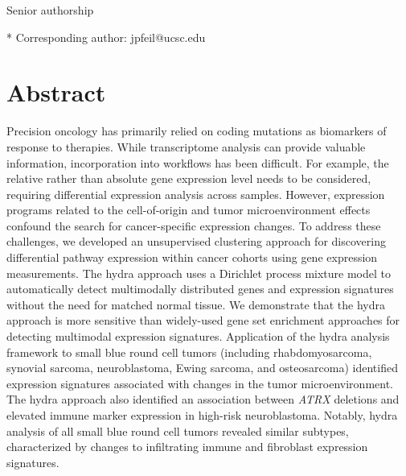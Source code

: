 \documentclass[10pt,letterpaper]{article}
\begin{document}
\begin{flushleft}
%
%

\ddag Senior authorship




* Corresponding author: jpfeil@ucsc.edu

\end{flushleft}
\section*{Abstract}
Precision oncology has primarily relied on coding mutations as biomarkers of response to therapies. While transcriptome analysis can provide valuable information, incorporation into workflows has been difficult. For example, the relative rather than absolute gene expression level needs to be considered, requiring differential expression analysis across samples. However, expression programs related to the cell-of-origin and tumor microenvironment effects confound the search for cancer-specific expression changes. To address these challenges, we developed an unsupervised clustering approach for discovering differential pathway expression within cancer cohorts using gene expression measurements. The hydra approach uses a Dirichlet process mixture model to automatically detect multimodally distributed genes and expression signatures without the need for matched normal tissue. We demonstrate that the hydra approach is more sensitive than widely-used gene set enrichment approaches for detecting multimodal expression signatures. Application of the hydra analysis framework to small blue round cell tumors (including rhabdomyosarcoma, synovial sarcoma, neuroblastoma, Ewing sarcoma, and osteosarcoma) identified expression signatures associated with changes in the tumor microenvironment. The hydra approach also identified an association between \textit{ATRX} deletions and elevated immune marker expression in high-risk neuroblastoma. Notably, hydra analysis of all small blue round cell tumors revealed similar subtypes, characterized by changes to infiltrating immune and fibroblast expression signatures.
\end{document}
